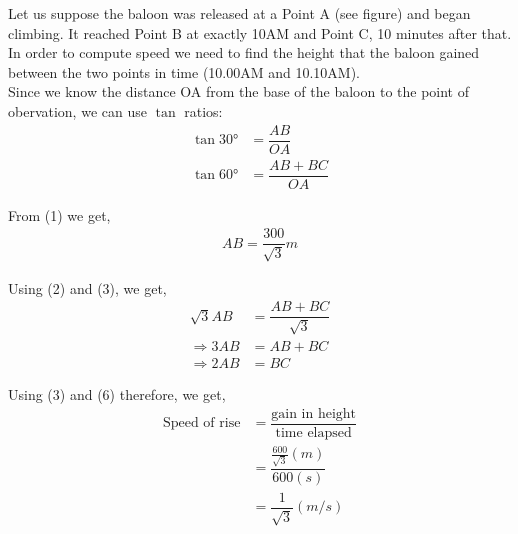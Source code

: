 \begin{solution}
	Let us suppose the baloon was released at a Point A (see figure) and began climbing. It reached Point B at exactly 10AM and Point C, 10 minutes after that. In order to compute speed we need to find the height that the baloon gained between the two points in time (10.00AM and 10.10AM). \\
	Since we know the distance OA from the base of the baloon to the point of obervation, we can use $\tan$ ratios:
	\begin{align}
		\tan\ang{30} &= \dfrac{AB}{OA}	\\		
		\tan\ang{60} &= \dfrac{AB+BC}{OA}
	\end{align}
	
	From (1) we get,
	\begin{align}
		AB = \dfrac{300}{\sqrt{3}} m
	\end{align}	
	
	Using (2) and (3), we get,
	\begin{align}
		\sqrt{3}AB &= \dfrac{AB+BC}{\sqrt{3}}	\\		
		\Rightarrow 3AB &= AB+BC				\\
		\Rightarrow 2AB &= BC
	\end{align}

	Using (3) and (6) therefore, we get,
	\begin{align}
		\text{Speed of rise} &= \dfrac{\text{gain in height}}{\text{time elapsed}} \\
							 &= \dfrac{\frac{600}{\sqrt{3}}(m)}{600(s)}	\\
							 &= \dfrac{1}{\sqrt{3}}(m/s)
	\end{align}	
		
\end{solution}
